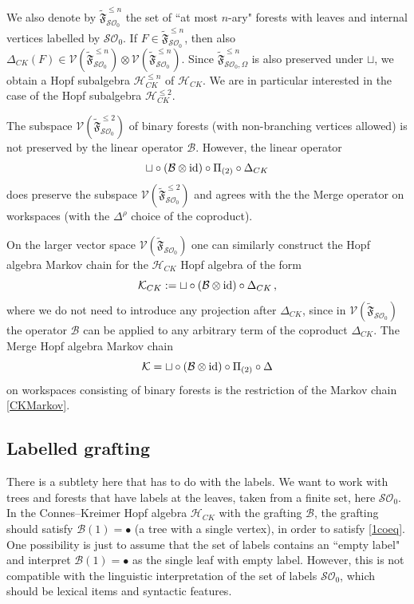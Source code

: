 \documentclass[12pt]{amsart}
\numberwithin{equation}{section}
\def\cB{{\mathcal B}}
\def\cH{{\mathcal H}}
\def\cK{{\mathcal K}}
\def\cO{{\mathcal O}}
\def\cS{{\mathcal S}}
\def\cV{{\mathcal V}}
\def\fF{{\mathfrak F}}
\begin{document}
\smallskip

We also denote by $\tilde\fF_{\cS\cO_0}^{\leq n}$ the
set of ``at most $n$-ary" forests with leaves and internal vertices labelled by $\cS\cO_0$. 
If $F \in \tilde\fF_{\cS\cO_0}^{\leq n}$, then also 
$\Delta_{CK}(F)\in \cV(\tilde\fF_{\cS\cO_0}^{\leq n})\otimes \cV(\tilde\fF_{\cS\cO_0}^{\leq n})$. 
Since $\tilde\fF_{\cS\cO_0,\Omega}^{\leq n}$ is also preserved under $\sqcup$, we obtain a Hopf subalgebra
$\cH_{CK}^{\leq n}$ of $\cH_{CK}$. We are in particular interested in the case of the Hopf subalgebra
$\cH_{CK}^{\leq 2}$. 

\smallskip

The subspace $\cV(\tilde\fF_{\cS\cO_0}^{\leq 2})$ of binary forests (with non-branching vertices allowed) 
is not preserved by the linear operator
$\cB$. However, the linear operator
$$ \sqcup \circ (\cB \otimes {\rm id}) \circ \Pi_{(2)} \circ \Delta_{CK} $$
does preserve the subspace $\cV(\tilde\fF_{\cS\cO_0}^{\leq 2})$ and agrees with 
the the Merge operator on workspaces (with the $\Delta^\rho$ choice of the coproduct). 

\smallskip

On the larger vector space $\cV(\tilde\fF_{\cS\cO_0})$ one can similarly construct the
Hopf algebra Markov chain for the $\cH_{CK}$ Hopf algebra of the form
\begin{equation}\label{CKMarkov}
\cK_{CK}:= \sqcup \circ (\cB\otimes {\rm id})\circ \Delta_{CK} \, ,
\end{equation}
where we do not need to introduce any projection after $\Delta_{CK}$, since in
$\cV(\tilde\fF_{\cS\cO_0})$ the operator $\cB$ can be applied to any arbitrary
term of the coproduct $\Delta_{CK}$. 
The Merge Hopf algebra Markov chain
$$ \cK= \sqcup \circ (\cB\otimes {\rm id})\circ \Pi_{(2)} \circ \Delta $$
on workspaces consisting of binary forests is the restriction of
the Markov chain \eqref{CKMarkov}. 



\smallskip
\subsection{Labelled grafting}\label{labelBSec}  

There is a subtlety here that has to do with the labels. We want to work with trees and forests
that have labels at the leaves, taken from a finite set, here $\cS\cO_0$. In the Connes--Kreimer Hopf 
algebra $\cH_{CK}$ with the grafting $\cB$, the grafting should satisfy $\cB(1)=\bullet$ (a tree with
a single vertex), in order to satisfy \eqref{1coeq}. 
One possibility is just to assume that the set of labels contains an ``empty label" and interpret $\cB(1)=\bullet$ as the
single leaf with empty label. However, this is not compatible with the linguistic interpretation of
the set of labels $\cS\cO_0$, which should be lexical items and syntactic features. 
\end{document}
